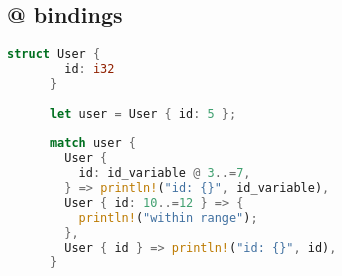\documentclass{article}
\begin{document}
\subsection{@ bindings}

\begin{lstlisting}[language=Rust, style=boxed, numbers=none]
    struct User {
        id: i32
      }
          
      let user = User { id: 5 };
          
      match user {
        User {
          id: id_variable @ 3..=7,
        } => println!("id: {}", id_variable),
        User { id: 10..=12 } => {
          println!("within range");
        },
        User { id } => println!("id: {}", id),
      }
\end{lstlisting}
\end{document}
